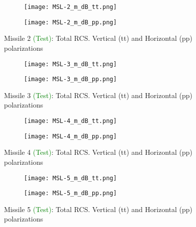   \begin{figure}[htbp]
    \centering
    \begin{subfigure}{.5\textwidth}
      \centering
      \texttt{[image: MSL-2\_m\_dB\_tt.png]}
    \end{subfigure}%
    \begin{subfigure}{.5\textwidth}
      \centering
      \texttt{[image: MSL-2\_m\_dB\_pp.png]}
    \end{subfigure}
    \caption{Missile 2 \textcolor{green}{(Test)}:  Total RCS. Vertical (tt) and Horizontal (pp) polarizations }
    \label{fig:c2}
  \end{figure}

  \begin{figure}[htbp]
    \centering
    \begin{subfigure}{.5\textwidth}
      \centering
      \texttt{[image: MSL-3\_m\_dB\_tt.png]}
    \end{subfigure}%
    \begin{subfigure}{.5\textwidth}
      \centering
      \texttt{[image: MSL-3\_m\_dB\_pp.png]}
    \end{subfigure}
    \caption{Missile 3 \textcolor{green}{(Test)}:  Total RCS. Vertical (tt) and Horizontal (pp) polarizations }
    \label{fig:c3}
  \end{figure}

  \begin{figure}[htbp]
    \centering
    \begin{subfigure}{.5\textwidth}
      \centering
      \texttt{[image: MSL-4\_m\_dB\_tt.png]}
    \end{subfigure}%
    \begin{subfigure}{.5\textwidth}
      \centering
      \texttt{[image: MSL-4\_m\_dB\_pp.png]}
    \end{subfigure}
    \caption{Missile 4 \textcolor{green}{(Test)}:  Total RCS. Vertical (tt) and Horizontal (pp) polarizations }
    \label{fig:c4}
  \end{figure}

  \begin{figure}[htbp]
    \centering
    \begin{subfigure}{.5\textwidth}
      \centering
      \texttt{[image: MSL-5\_m\_dB\_tt.png]}
    \end{subfigure}%
    \begin{subfigure}{.5\textwidth}
      \centering
      \texttt{[image: MSL-5\_m\_dB\_pp.png]}
    \end{subfigure}
    \caption{Missile 5 \textcolor{green}{(Test)}:  Total RCS. Vertical (tt) and Horizontal (pp) polarizations }
    \label{fig:c5}
  \end{figure}

